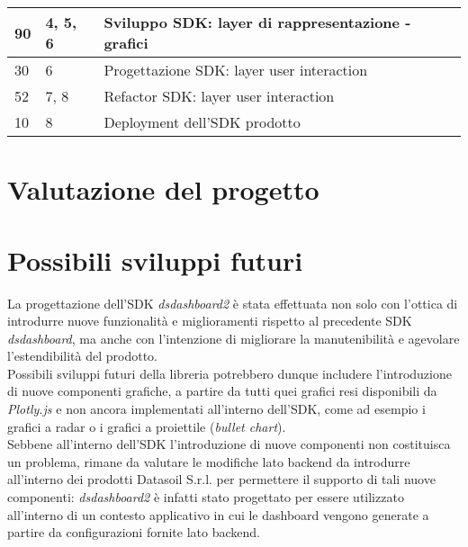 \begin{center}
\begin{longtable}{|p{2.5cm}|p{2.5cm}|p{7.5cm}|}
        \hline
        90                                 & 4, 5, 6                                          & Sviluppo SDK: layer di  rappresentazione - grafici                              \\
        \hline
        30                                 & 6                                                & Progettazione SDK: layer user interaction                                       \\
        \hline
        52                                 & 7, 8                                             & Refactor SDK: layer user interaction                                            \\
        \hline
        10                                 & 8                                                & Deployment dell'SDK prodotto                                                    \\
    \end{longtable}
    \label{tab:consuntivo_finale}
\end{center}


\section{Valutazione del progetto}

\section{Possibili sviluppi futuri}
La progettazione dell'SDK \textit{dsdashboard2} è stata effettuata non solo con l'ottica di introdurre nuove funzionalità e miglioramenti rispetto al precedente
SDK \textit{dsdashboard}, ma anche con l'intenzione di migliorare la manutenibilità e agevolare l'estendibilità del prodotto. \\
Possibili sviluppi futuri della libreria potrebbero dunque includere l'introduzione di nuove componenti grafiche, a partire da tutti quei grafici resi disponibili
da \textit{Plotly.js} e non ancora implementati all'interno dell'SDK, come ad esempio i grafici a radar o i grafici a proiettile (\textit{bullet chart}). \\
Sebbene all'interno dell'SDK l'introduzione di nuove componenti non costituisca un problema, rimane da valutare le modifiche lato backend da introdurre all'interno
dei prodotti Datasoil S.r.l. per permettere il supporto di tali nuove componenti: \textit{dsdashboard2} è infatti stato progettato per essere utilizzato all'interno
di un contesto applicativo in cui le dashboard vengono generate a partire da configurazioni fornite lato backend.

